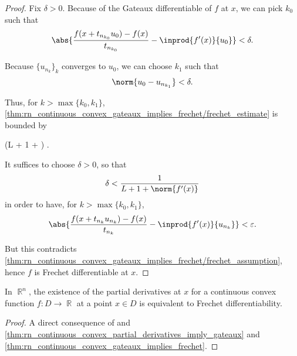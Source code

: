 \begin{proof}
  Fix \( \delta > 0 \). Because of the Gateaux differentiable of \( f \) at \( x \), we can pick \( k_0 \) such that
  \begin{equation*}
    \abs{\frac {f(x + t_{n_{k_0}} u_0) - f(x)} {t_{n_{k_0}}} - \inprod{f'(x)} {u_0}} < \delta.
  \end{equation*}

  Because \( \{ u_{n_k} \}_k \) converges to \( u_0 \), we can choose \( k_1 \) such that
  \begin{equation*}
    \norm{u_0 - u_{n_{k_1}}} < \delta.
  \end{equation*}

  Thus, for \( k > \max \{ k_0, k_1 \} \), \cref{thm:rn_continuous_convex_gateaux_implies_frechet/frechet_estimate} is bounded by
  \begin{balign*}
    \leq
    (L + 1 + ) \delta.
  \end{balign*}

  It suffices to choose \( \delta > 0 \), so that
  \begin{equation*}
    \delta < \frac 1 {L + 1 + \norm{f'(x)}}
  \end{equation*}
  in order to have, for \( k > \max \{ k_0, k_1 \} \),
  \begin{equation*}
    \abs{\frac {f(x + t_{n_k} u_{n_k}) - f(x)} {t_{n_k}} - \inprod{f'(x)} {u_{n_k}}} < \varepsilon.
  \end{equation*}

  But this contradicts \cref{thm:rn_continuous_convex_gateaux_implies_frechet/frechet_assumption}, hence \( f \) is Frechet differentiable at \( x \).
\end{proof}

\begin{corollary}\label{thm:rn_continuous_convex_partial_derivatives_imply_frechet}
  In \( \BbbR^n \), the existence of the partial derivatives at \( x \) for a continuous convex function \( f: D \to \BbbR \) at a point \( x \in D \) is equivalent to Frechet differentiability.
\end{corollary}
\begin{proof}
  A direct consequence of and \cref{thm:rn_continuous_convex_partial_derivatives_imply_gateaux} and \cref{thm:rn_continuous_convex_gateaux_implies_frechet}.
\end{proof}

